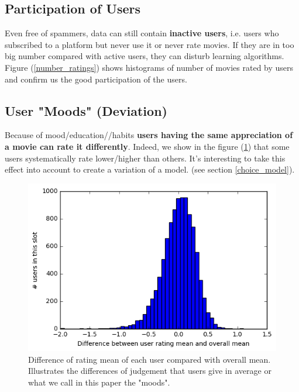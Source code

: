 \documentclass[10pt,conference,compsocconf]{IEEEtran}
\begin{document}
\subsection{Participation of Users}

Even free of spammers, data can still contain \textbf{inactive users}, i.e. users who subscribed to a platform but never use it or never rate movies. If they are in too big number compared with active users, they can disturb learning algorithms. Figure (\ref{number_ratings}) shows histograms of number of movies rated by users and confirm us the good participation of the users.

\subsection{User "Moods" (Deviation)}

Because of mood/education//habits \textbf{users having the same appreciation of a movie can rate it differently}. Indeed, we show in the figure (\ref{mood}) that some users systematically rate lower/higher than others. It's interesting to take this effect into account to create a variation of a model. (see section \ref{choice_model}).

\begin{figure}[htbp] %
  \centering
  \includegraphics[width=\columnwidth]{img/Deviation_mean}
  \caption{Difference of rating mean of each user compared with overall mean. Illustrates the differences of judgement that users give in average or what we call in this paper the "moods".}
  \vspace{-3mm}
  \label{mood}
\end{figure}
\end{document}
